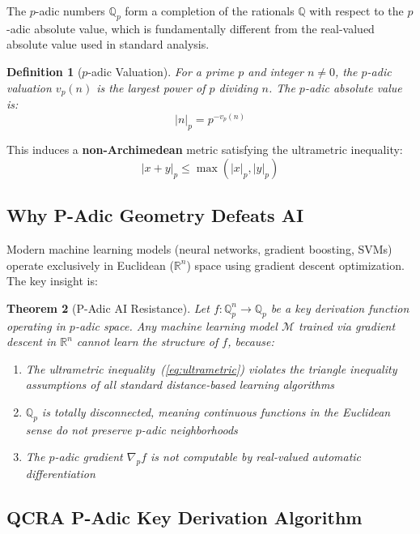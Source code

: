 \documentclass[11pt,a4paper]{article}
\newtheorem{theorem}{Theorem}[section]
\newtheorem{definition}[theorem]{Definition}
\begin{document}
The $p$-adic numbers $\mathbb{Q}_p$ form a completion of the rationals
$\mathbb{Q}$ with respect to the $p$-adic absolute value, which is
fundamentally different from the real-valued absolute value used in
standard analysis.

\begin{definition}[$p$-adic Valuation]
For a prime $p$ and integer $n \neq 0$, the $p$-adic valuation
$v_p(n)$ is the largest power of $p$ dividing $n$. The $p$-adic
absolute value is:
\begin{equation}
|n|_p = p^{-v_p(n)}
\end{equation}
\end{definition}

This induces a \textbf{non-Archimedean} metric satisfying the
ultrametric inequality:
\begin{equation}
|x + y|_p \leq \max(|x|_p, |y|_p)
\label{eq:ultrametric}
\end{equation}

\subsection{Why P-Adic Geometry Defeats AI}

Modern machine learning models (neural networks, gradient boosting,
SVMs) operate exclusively in Euclidean ($\mathbb{R}^n$) space using
gradient descent optimization. The key insight is:

\begin{theorem}[P-Adic AI Resistance]
\label{thm:padic-ai}
Let $f: \mathbb{Q}_p^n \to \mathbb{Q}_p$ be a key derivation function
operating in $p$-adic space. Any machine learning model $\mathcal{M}$
trained via gradient descent in $\mathbb{R}^n$ cannot learn the
structure of $f$, because:
\begin{enumerate}[nosep]
  \item The ultrametric inequality~(\ref{eq:ultrametric}) violates the
    triangle inequality assumptions of all standard distance-based
    learning algorithms
  \item $\mathbb{Q}_p$ is totally disconnected, meaning continuous
    functions in the Euclidean sense do not preserve $p$-adic
    neighborhoods
  \item The $p$-adic gradient $\nabla_p f$ is not computable by
    real-valued automatic differentiation
\end{enumerate}
\end{theorem}

\subsection{QCRA P-Adic Key Derivation Algorithm}
\end{document}

